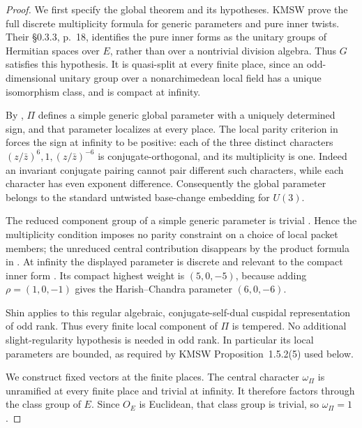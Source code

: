 \begin{proof}
We first specify the global theorem and its hypotheses. KMSW
\cite[Theorem~5.0.5 and its preceding paragraph, p.~206]{K17KMSW2014}
prove the full discrete multiplicity formula for generic parameters and
pure inner twists. Their \S0.3.3, p.~18, identifies the pure inner forms
as the unitary groups of Hermitian spaces over $E$, rather than over a
nontrivial division algebra. Thus $G$ satisfies this hypothesis. It is
quasi-split at every finite place, since an odd-dimensional unitary group
over a nonarchimedean local field has a unique isomorphism class, and is
compact at infinity.

By \cite[Propositions~1.3.1 and~1.3.3, pp.~67, 70--71]{K17KMSW2014},
$\Pi$ defines a simple generic global parameter with a uniquely determined
sign, and that parameter localizes at every place. The local parity
criterion in \cite[\S1.2.3 and Lemma~1.2.5, pp.~59--61]{K17KMSW2014}
forces the sign at infinity to be positive: each of the three distinct
characters $(z/\bar z)^6,1,(z/\bar z)^{-6}$ is conjugate-orthogonal,
and its multiplicity is one. Indeed an invariant conjugate pairing cannot
pair different such characters, while each character has even exponent
difference. Consequently the global parameter belongs to the standard
untwisted base-change embedding for $U(3)$.

The reduced component group of a simple generic parameter is trivial
\cite[\S1.3.4--1.3.5, pp.~69--70]{K17KMSW2014}. Hence the multiplicity
condition imposes no parity constraint on a choice of local packet members;
the unreduced central contribution disappears by the product formula in
\cite[\S1.7, pp.~88--89]{K17KMSW2014}. At infinity the displayed parameter
is discrete and relevant to the compact inner form
\cite[Remark~A.11.8, p.~236]{K17BCFamilies2009}. Its compact highest weight
is $(5,0,-5)$, because adding $\rho=(1,0,-1)$ gives the Harish--Chandra
parameter $(6,0,-6)$.

Shin \cite[Theorem~1.2 and Corollary~1.3, pp.~1647--1648;
Corollary~7.9 and its printed proof, p.~1728]{K17Shin2011}
applies to this regular algebraic, conjugate-self-dual cuspidal
representation of odd rank. Thus every finite local component of $\Pi$
is tempered. No additional slight-regularity hypothesis is needed in odd
rank. In particular its local parameters are bounded, as required by
KMSW Proposition~1.5.2(5) used below.

We construct fixed vectors at the finite places. The central character
$\omega_\Pi$ is unramified at every finite place and trivial at infinity.
It therefore factors through the class group of $E$. Since $O_E$ is
Euclidean, that class group is trivial, so $\omega_\Pi=1$.


\end{proof}
